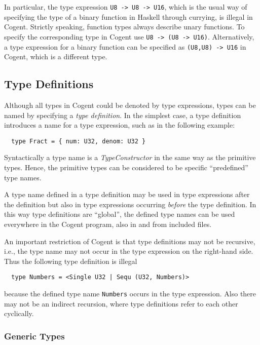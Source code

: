\documentclass[a4paper]{report}
\newcommand{\code}[1]{\textnormal{\texttt{#1}}}
\newcommand{\cogent}{Cogent\xspace}
\begin{document}
In particular, the type expression \code{U8 -> U8 -> U16}, which is the usual way of specifying the type of a binary function in Haskell through
currying, is illegal in \cogent. Strictly speaking, function types always describe unary functions. To specify the corresponding type 
in \cogent use \code{U8 -> (U8 -> U16)}. Alternatively, a type expression for a binary function can
be specified as \code{(U8,U8) -> U16} in \cogent, which is a different type.

\subsection{Type Definitions}
\label{def-type}

Although all types in \cogent could be denoted by type expressions, types can be named by specifying a 
\textit{type definition}. In the simplest case, a type definition introduces a name for a type expression,
such as in the following example:

\begin{verbatim}
  type Fract = { num: U32, denom: U32 }
\end{verbatim}

Syntactically a type name is a \textit{TypeConstructor} in the same way as the primitive types. Hence, the 
primitive types can be considered to be specific ``predefined'' type names.

A type name defined in a type definition may be used in type expressions after the definition but also in type
expressions occurring \textit{before} the type definition. In this way type definitions are ``global'', the 
defined type names can be used everywhere in the \cogent program,  also in and from included files.

An important restriction of \cogent is that type definitions may not be recursive, i.e., the type name may
not occur in the type expression on the right-hand side. Thus the following type definition is illegal
\begin{verbatim}
  type Numbers = <Single U32 | Sequ (U32, Numbers)>
\end{verbatim}
because the defined type name \code{Numbers} occurs in the type expression. Also there may not be an indirect
recursion, where type definitions refer to each other cyclically.

\subsubsection{Generic Types}
\end{document}
